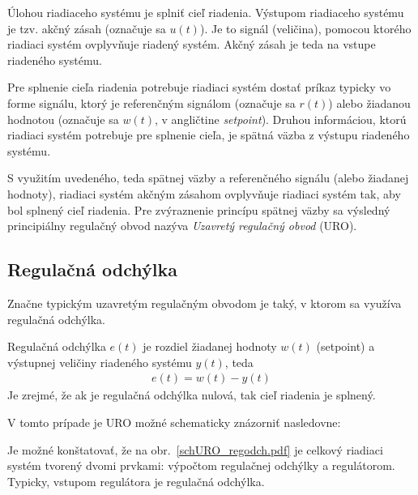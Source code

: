 \documentclass[a4paper, 10pt, ]{article}
\begin{document}
Úlohou riadiaceho systému je splniť cieľ riadenia. Výstupom riadiaceho systému je tzv. akčný zásah (označuje sa $u(t)$). Je to signál (veličina), pomocou ktorého riadiaci systém ovplyvňuje riadený systém. Akčný zásah je teda na vstupe riadeného systému.

Pre splnenie cieľa riadenia potrebuje riadiaci systém dostať príkaz typicky vo forme signálu, ktorý je referenčným signálom (označuje sa $r(t)$) alebo žiadanou hodnotou (označuje sa $w(t)$, v angličtine \emph{setpoint}). Druhou informáciou, ktorú riadiaci systém potrebuje pre splnenie cieľa, je spätná väzba z výstupu riadeného systému.

S využitím uvedeného, teda spätnej väzby a referenčného signálu (alebo žiadanej hodnoty), riadiaci systém akčným zásahom ovplyvňuje riadiaci systém tak, aby bol splnený cieľ riadenia. Pre zvýraznenie princípu spätnej väzby sa výsledný principiálny regulačný obvod nazýva \emph{Uzavretý regulačný obvod} (URO).




\subsection{Regulačná odchýlka}

Značne typickým uzavretým regulačným obvodom je taký, v ktorom sa využíva regulačná odchýlka.

Regulačná odchýlka $e(t)$ je rozdiel žiadanej hodnoty $w(t)$ (setpoint) a výstupnej veličiny riadeného systému $y(t)$, teda
\begin{align} \label{regodch}
    e(t) = w(t) - y(t)
\end{align}
Je zrejmé, že ak je regulačná odchýlka nulová, tak cieľ riadenia je splnený.

V tomto prípade je URO možné schematicky znázorniť nasledovne:

\begin{center}


	\label{schURO_regodch.pdf}

\end{center}

Je možné konštatovať, že na obr.~\ref{schURO_regodch.pdf} je celkový riadiaci systém tvorený dvomi prvkami: výpočtom regulačnej odchýlky a regulátorom. Typicky, vstupom regulátora je regulačná odchýlka.
\end{document}
